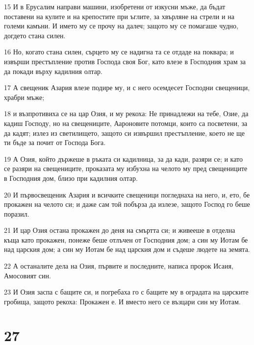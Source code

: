 \par 15 И в Ерусалим направи машини, изобретени от изкусни мъже, да бъдат поставени на кулите и на крепостите при ъглите, за хвърляне на стрели и на големи камъни. И името му се прочу на далеч; защото му се помагаше чудно, догдето стана силен.
\par 16 Но, когато стана силен, сърцето му се надигна та се отдаде на поквара; и извърши престъпление против Господа своя Бог, като влезе в Господния храм за да покади върху кадилния олтар.
\par 17 А свещеник Азария влезе подире му, и с него осемдесет Господни свещеници, храбри мъже;
\par 18 и възпротивиха се на цар Озия, и му рекоха: Не принадлежи на тебе, Озие, да кадиш Господу, но на свещениците, Аароновите потомци, които са посветени, за да кадят; излез из светилището, защото си извършил престъпление, което не ще ти бъде за почит от Господа Бога.
\par 19 А Озия, който държеше в ръката си кадилница, за да кади, разяри се; и като се разяри на свещениците, проказата му избухна на челото му пред свещениците в Господния дом, близо при кадилния олтар.
\par 20 И първосвещеник Азария и всичките свещеници погледнаха на него, и, ето, бе прокажен на челото си; и даже сам той побърза да излезе, защото Господ го беше поразил.
\par 21 И цар Озия остана прокажен до деня на смъртта си; и живееше в отделна къща като прокажен, понеже беше отлъчен от Господния дом; а син му Иотам бе над царския дом; а син му Иотам бе над царския дом и съдеше людете на земята.
\par 22 А останалите дела на Озия, първите и последните, написа пророк Исаия, Амосовият син.
\par 23 И Озия заспа с бащите си, и погребаха го с бащите му в оградата на царските гробища, защото рекоха: Прокажен е. И вместо него се възцари син му Иотам.

\chapter{27}

